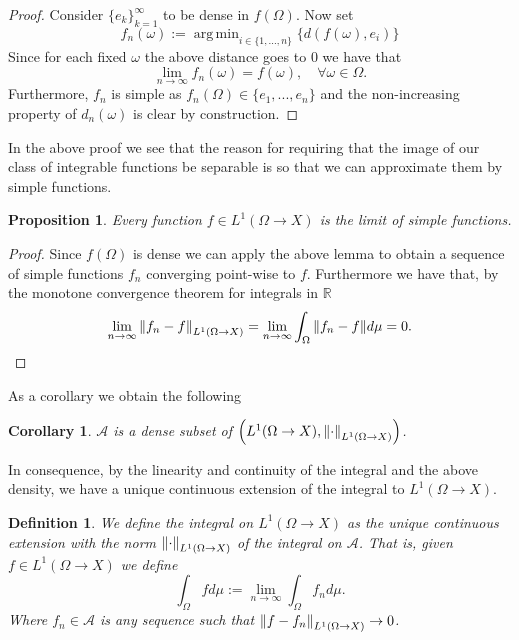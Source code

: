 \documentclass[12pt]{article}
\DeclareMathOperator*{\argmin}{arg\,min}
\newtheorem{proposition}{Proposition}
\newtheorem{definition}{Definition}
\newtheorem{corollary}{Corollary}
\begin{document}
\begin{proof}
	Consider $\{e_k\}_{k=1}^\infty$ to be dense in $f(\Omega)$. Now set
	\begin{equation*}
		f_n(\omega):= \argmin_{i\in\{1,...,n\}} \{d(f(\omega),e_i)\}
	\end{equation*}
	Since for each fixed $\omega$ the above distance goes to $0$ we have that
	\begin{equation*}
		\lim_{n\to\infty} f_n(\omega)=f(\omega),\quad \forall \omega\in\Omega.
	\end{equation*}
	Furthermore, $f_n$ is simple as $f_n(\Omega)\in \{e_1,...,e_n\}$ and the non-increasing property of $d_n(\omega)$ is clear by construction.
\end{proof}
In the above proof we see that the reason for requiring that the image of our class of integrable functions be separable is so that we can approximate them by simple functions.
\begin{proposition}
	Every function $f\in L^1(\Omega\to X)$ is the limit of simple functions.
\end{proposition}
\begin{proof}
	Since $f(\Omega)$ is dense we can apply the above lemma to obtain a sequence of simple functions $f_n$ converging point-wise to $f$. Furthermore we have that, by the monotone convergence theorem for integrals in $\mathbb{R}$
	\begin{equation*}
		\lim_{n\to\infty}\norm{f_n-f}_{L^1(\Omega\to X)}=\lim_{n\to\infty}\int_\Omega\norm{f_n-f}d\mu=0.
	\end{equation*}
\end{proof}
As a corollary we obtain the following
\begin{corollary}
	$\mathcal{A}$ is a dense subset of $\qty(L^1(\Omega\to X),\norm{\cdot}_{L^1(\Omega\to X)})$.
\end{corollary}
In consequence, by the linearity and continuity of the integral and the above density, we have a unique continuous extension of the integral to $L^1(\Omega\to X)$.
\begin{definition}
	We define the integral on $L^1(\Omega\to X)$ as the unique continuous extension with the norm $\norm{\cdot}_{L^1(\Omega\to X)}$ of the integral on $\mathcal{A}$. That is, given $f\in L^1(\Omega\to X)$ we define
	\begin{equation*}
		\int_\Omega f d\mu:=\lim_{n\to\infty} \int_\Omega f_n d\mu.
	\end{equation*}
	Where $f_n\in \mathcal{A}$ is any sequence such that $\norm{f-f_n}_{L^1(\Omega\to X)}\to 0$.
\end{definition}
\end{document}
